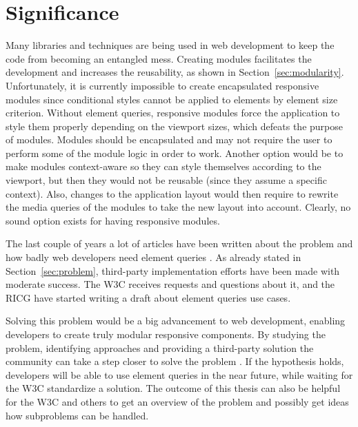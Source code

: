 \documentclass[a4paper,11pt]{kth-mag}
\begin{document}
    \section{Significance}
      Many libraries and techniques are being used in \gls{web} development to keep the code from becoming an entangled mess.
      Creating modules facilitates the development and increases the reusability, as shown in Section~\ref{sec:modularity}.
      Unfortunately, it is currently impossible to create \gls{encapsulated} \gls{responsive} modules since conditional styles cannot be applied to \glspl{element} by \gls{element} size criterion.
      Without element queries, \gls{responsive} modules force the application to style them properly depending on the \gls{viewport} sizes, which defeats the purpose of modules.
      Modules should be \gls{encapsulated} and may not require the user to perform some of the module logic in order to work.
      Another option would be to make modules context-aware so they can style themselves according to the \gls{viewport}, but then they would not be reusable (since they assume a specific context).
      Also, changes to the application layout would then require to rewrite the \gls{media queries} of the modules to take the new layout into account.
      Clearly, no sound option exists for having \gls{responsive} modules.

      The last couple of years a lot of articles have been written about the problem and how badly \gls{web} developers need element queries \cite{eq_article_localised-css,eq_article_backalley,eq_article_mqhack,eq_article_tabatkjr,eq_article_filament,eq_article_tyson,eq_article_neal,eq_article_css-tricks,eq_article_hugo,eq_article_fremycompany,eq_article_discource,eq_article_matt}.
      As already stated in Section~\ref{sec:problem}, \gls{third-party} implementation efforts have been made with moderate success.
      The \gls{W3C} receives requests and questions about it, and the \gls{RICG} have started writing a draft \cite{ricg_draft} about element queries use cases.

      Solving this problem would be a big advancement to \gls{web} development, enabling developers to create truly modular \gls{responsive} components.
      By studying the problem, identifying approaches and providing a \gls{third-party} solution the community can take a step closer to solve the problem .
      If the hypothesis holds, developers will be able to use element queries in the near future, while waiting for the \gls{W3C} standardize a solution. 
      The outcome of this thesis can also be helpful for the \gls{W3C} and others to get an overview of the problem and possibly get ideas how subproblems can be handled.
\end{document}
